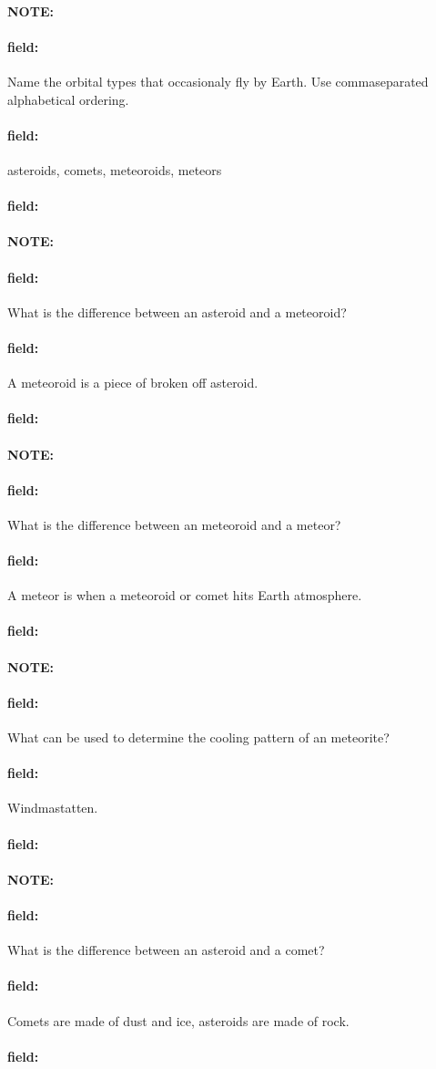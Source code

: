 \documentclass[12pt]{article}
\newenvironment{note}{\paragraph{NOTE:}}{}
\newenvironment{field}{\paragraph{field:}}{}
\begin{document}
\begin{note}
   \begin{field}
       Name the orbital types that occasionaly fly by Earth. Use commaseparated alphabetical ordering.
   \end{field}
   \begin{field}
		asteroids, comets, meteoroids, meteors
   \end{field}
   \begin{field}
   \end{field}
\end{note}
\begin{note}
   \begin{field}
       What is the difference between an asteroid and a meteoroid?
   \end{field}
   \begin{field}
		A meteoroid is a piece of broken off asteroid.
   \end{field}
   \begin{field}
   \end{field}
\end{note}
\begin{note}
   \begin{field}
       What is the difference between an meteoroid and a meteor?
   \end{field}
   \begin{field}
		A meteor is when a meteoroid or comet hits Earth atmosphere.
   \end{field}
   \begin{field}
   \end{field}
\end{note}
\begin{note}
   \begin{field}
       What can be used to determine the cooling pattern of an meteorite?
   \end{field}
   \begin{field}
		Windmastatten.
   \end{field}
   \begin{field}
   \end{field}
\end{note}
\begin{note}
   \begin{field}
       What is the difference between an asteroid and a comet?
   \end{field}
   \begin{field}
		Comets are made of dust and ice, asteroids are made of rock.
   \end{field}
   \begin{field}
   \end{field}
\end{note}
\end{document}
